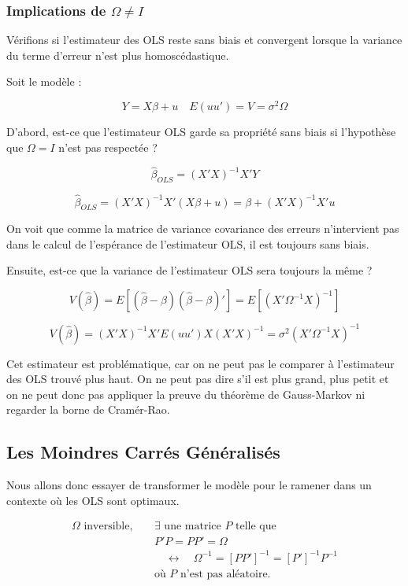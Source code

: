 \documentclass[14pt]{extarticle} %
\theoremstyle{definition}
\theoremstyle{plain}
\begin{document}
\subsubsection{Implications de $\Omega \neq I$}

Vérifions si l’estimateur des OLS reste sans biais et convergent lorsque la variance du terme d’erreur n’est plus homoscédastique.

Soit le modèle :

\[
Y = X\beta + u \quad E(uu') = V = \sigma^2 \Omega
\]

D’abord, est-ce que l’estimateur OLS garde sa propriété sans biais si l’hypothèse que $\Omega = I$ n’est pas respectée ?

\[
\hat{\beta}_{OLS} = (X'X)^{-1}X'Y
\]

\[
\hat{\beta}_{OLS} = (X'X)^{-1}X'(X\beta + u) = \beta + (X'X)^{-1}X'u
\]

On voit que comme la matrice de variance covariance des erreurs n’intervient pas dans le calcul de l’espérance de l’estimateur OLS, il est toujours sans biais.

Ensuite, est-ce que la variance de l’estimateur OLS sera toujours la même ?

\[
V(\hat{\beta}) = E[(\hat{\beta} - \beta)(\hat{\beta} - \beta)'] = E[(X'\Omega^{-1} X)^{-1}]
\]

\[
V(\hat{\beta}) = (X'X)^{-1}X' E(uu') X (X'X)^{-1} = \sigma^2 (X'\Omega^{-1} X)^{-1}
\]

Cet estimateur est problématique, car on ne peut pas le comparer à l’estimateur des OLS trouvé plus haut. On ne peut pas dire s’il est plus grand, plus petit et on ne peut donc pas appliquer la preuve du théorème de Gauss-Markov ni regarder la borne de Cramér-Rao.

\subsection{Les Moindres Carrés Généralisés}

Nous allons donc essayer de transformer le modèle pour le ramener dans un contexte où les OLS sont optimaux.

\begin{align*}
\Omega \text{ inversible}, \quad & \exists \text{ une matrice } P \text{ telle que } \\
& P'P = PP' = \Omega \\
& \quad \leftrightarrow \quad \Omega^{-1} = [PP']^{-1} = [P']^{-1}P^{-1} \\
& \text{où } P \text{ n’est pas aléatoire.}
\end{align*}
\end{document}
